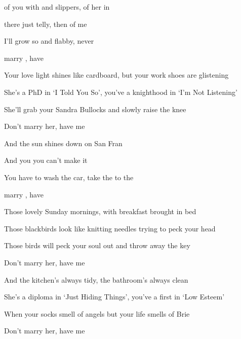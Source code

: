
\zs

 of you with  and slippers,  of her in 

 there just  telly, then  of me 

I'll  grow so  and flabby,  never 

 marry , have 
\ks

\zs
Your love light shines like cardboard, but your work shoes are glistening

She's a PhD in `I Told You So', you've a knighthood in `I'm Not Listening'

She'll grab your Sandra Bullocks and slowly raise the knee

Don't marry her, have me
\ks

\zr

And the  sun shines down on San Fran

And you  you can't make it 

You have to wash the car, take the  to the 

 marry , have 
\kr

\zs
Those lovely Sunday mornings, with breakfast brought in bed

Those blackbirds look like knitting needles trying to peck your head

Those birds will peck your soul out and throw away the key

Don't marry her, have me
\ks

\zs
And the kitchen's always tidy, the bathroom's always clean

She's a diploma in `Just Hiding Things', you've a first in `Low Esteem'

When your socks smell of angels but your life smells of Brie

Don't marry her, have me
\ks

\zr
\kr

\zr
\kr

\kp
